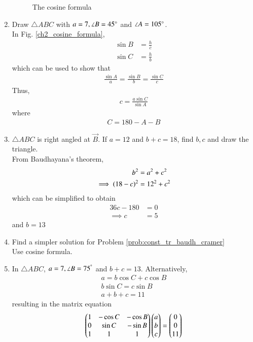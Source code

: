 \begin{enumerate}[label=\arabic*.,ref=\thesubsection.\theenumi]
\begin{figure}[!ht]
\begin{center}
		\resizebox{\columnwidth}{!}{}
	\end{center}
	\caption{The cosine formula}
	\label{ch2_cosine_formula}	
\end{figure}

\item Draw $\triangle ABC$ with $a = 7, \angle B = 45\degree$ and $\angle A = 105 \degree$. 
\\
\solution In Fig. \eqref{ch2_cosine_formula},	
\begin{align}
\label{eq:sin_form_def}
\sin B &= \frac{h}{c}
\\
\sin C &= \frac{h}{b}
\end{align}
%
which can be used to show that
\begin{align}
\label{eq:sin_form}
\frac{\sin A}{a}=\frac{\sin B}{b}=\frac{\sin C}{c}
\end{align}
%
Thus, 
\begin{align}
c = \frac{a\sin C}{\sin A}
\end{align}
where
\begin{align}
C = 180-A-B
\end{align}
\item $\triangle ABC$ is right angled at $\vec{B}$.  If $a = 12$ and $b+c = 18$, find $b,c$ and draw the triangle.
\\
\solution From Baudhayana's theorem, 
\begin{align}
b^2 &= a^2 + c^2
\\
\implies \left(18-c\right)^2 &= 12^2 +c^2
\end{align}
which can be simplified to obtain
\begin{align}
 36c -180&= 0
\\
\implies c&=5
\end{align}
%
and $b = 13$
\item Find a simpler solution for  Problem \ref{prob:const_tr_baudh_cramer} 
\\
\solution Use cosine formula.
\item In $\triangle ABC$,  $a = 7, \angle B = 75^{\degree}$ and $b+c = 13$. 
Alternatively, 
\begin{align}
a = b \cos C + c \cos B
\\
b \sin C = c \sin B
\\
a + b+c = 11
\end{align}
%
resulting  in the matrix equation 
\begin{align}
\begin{pmatrix}
1 & -\cos C & - \cos B
\\
0 & \sin C &- \sin B
\\
1 & 1 & 1
\end{pmatrix}
\begin{pmatrix}a \\b\\c\end{pmatrix} = \begin{pmatrix}0 \\ 0 \\ 11\end{pmatrix}
\end{align}


\end{enumerate}
